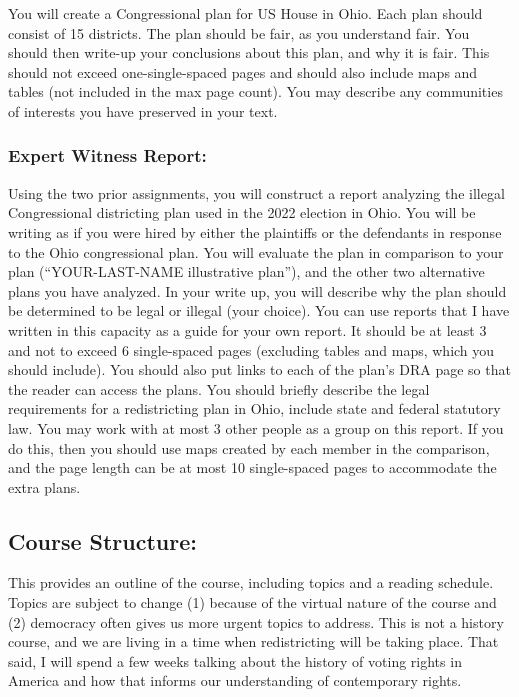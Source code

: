 \documentclass[
]{article}
\begin{document}
You will create a Congressional plan for US House in Ohio. Each plan
should consist of 15 districts. The plan should be fair, as you
understand fair. You should then write-up your conclusions about this
plan, and why it is fair. This should not exceed one-single-spaced pages
and should also include maps and tables (not included in the max page
count). You may describe any communities of interests you have preserved
in your text.

\hypertarget{expert-witness-report}{%
\subsubsection{Expert Witness Report:}\label{expert-witness-report}}

Using the two prior assignments, you will construct a report analyzing
the illegal Congressional districting plan used in the 2022 election in
Ohio. You will be writing as if you were hired by either the plaintiffs
or the defendants in response to the Ohio congressional plan. You will
evaluate the plan in comparison to your plan (``YOUR-LAST-NAME
illustrative plan''), and the other two alternative plans you have
analyzed. In your write up, you will describe why the plan should be
determined to be legal or illegal (your choice). You can use reports
that I have written in this capacity as a guide for your own report. It
should be at least 3 and not to exceed 6 single-spaced pages (excluding
tables and maps, which you should include). You should also put links to
each of the plan's DRA page so that the reader can access the plans. You
should briefly describe the legal requirements for a redistricting plan
in Ohio, include state and federal statutory law. You may work with at
most 3 other people as a group on this report. If you do this, then you
should use maps created by each member in the comparison, and the page
length can be at most 10 single-spaced pages to accommodate the extra
plans.

\hypertarget{course-structure}{%
\subsection{Course Structure:}\label{course-structure}}

This provides an outline of the course, including topics and a reading
schedule. Topics are subject to change (1) because of the virtual nature
of the course and (2) democracy often gives us more urgent topics to
address. This is not a history course, and we are living in a time when
redistricting will be taking place. That said, I will spend a few weeks
talking about the history of voting rights in America and how that
informs our understanding of contemporary rights.
\end{document}
